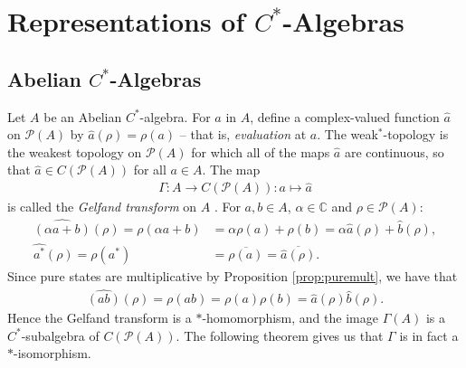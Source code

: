 \documentclass[11pt,a4paper]{report}
\theoremstyle{plain}
\theoremstyle{definition}
\newcommand{\1}{\mathbbm{1}}
\newcommand{\C}{\mathbb{C}}
\renewcommand{\P}[1]{\mathscr{P}(#1)}
\begin{document}
\chapter{Representations of $C^\ast$-Algebras}
\section{Abelian $C^\ast$-Algebras}\label{section:abelian}


Let $A$ be an Abelian $C^\ast$-algebra. For $a$ in $A$, define a complex-valued 
function $\hat{a}$ on $\P{A}$ by $\hat{a}(\rho)= \rho(a)$ -- that is, 
\emph{evaluation} at $a$. The weak$^\ast$-topology is the weakest topology on 
$\P{A}$ for which all of the maps $\hat{a}$ are continuous, so that $\hat{a} \in 
C(\P{A})$ for all $a\in A$. The map
\begin{align*}
	\Gamma:A \to C(\P{A}) : a\mapsto \hat{a}
\end{align*}
is called the \emph{Gelfand transform} on $A$ \cite{davidson96}.
For $a,b \in A$, $\alpha\in\C$ and $\rho\in\P{A}$:
\begin{align*}
		\widehat{(\alpha a+ b)}(\rho) = \rho(\alpha a+ b) 
	&=	\alpha\rho(a) +\rho(b) = \alpha\hat{a}(\rho)+\hat{b}(\rho), 					\\
		\widehat{a^\ast}(\rho) = \rho(a^\ast) 
	&= \overline{\rho(a)} = \overline{\hat{a}(\rho)}.
\end{align*}
Since pure states are multiplicative by Proposition \ref{prop:puremult}, we have that 
\begin{align*}
	\widehat{(ab)} (\rho)= \rho(ab) = \rho(a)\rho(b) = \hat{a}(\rho)\hat{b}(\rho).
\end{align*}
Hence the Gelfand transform is a $\ast$-homomorphism, and the image $\Gamma(A)$ 
is a $C^\ast$-subalgebra of $C(\P A)$. The following theorem gives us that 
$\Gamma$ is in fact a $\ast$-isomorphism.
\end{document}
